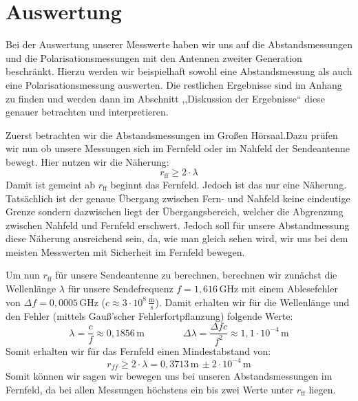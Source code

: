 \documentclass[titlepage,11pt,a4paper,ngerman]{article}
\newcommand{\tx}[1]{\textrm{#1}}
\begin{document}
\section{Auswertung}
Bei der Auswertung unserer Messwerte haben wir uns auf die Abstandsmessungen und die Polarisationsmessungen mit den Antennen zweiter Generation beschränkt. Hierzu werden wir beispielhaft sowohl eine Abstandsmessung als auch eine Polarisationsmessung auswerten. Die restlichen Ergebnisse sind im Anhang zu finden und werden dann im Abschnitt  ,,Diskussion der Ergebnisse`` diese genauer betrachten und interpretieren. \par 
Zuerst betrachten wir die Abstandsmessungen im Großen Hörsaal.Dazu prüfen wir nun ob unsere Messungen sich im Fernfeld oder im Nahfeld der Sendeantenne bewegt. Hier nutzen wir die Näherung:
\begin{equation}
r_{\tx{ff}} \geqslant 2\cdot\lambda
\end{equation}
Damit ist gemeint ab $r_{\tx{ff}}$ beginnt das Fernfeld. Jedoch ist das nur eine Näherung. Tatsächlich ist der genaue Übergang zwischen Fern- und Nahfeld keine eindeutige Grenze sondern dazwischen liegt der Übergangsbereich, welcher die Abgrenzung zwischen Nahfeld und Fernfeld erschwert. Jedoch soll für unsere Abstandmessung diese Näherung ausreichend sein, da, wie man gleich sehen wird, wir uns bei dem meisten Messwerten mit Sicherheit im Fernfeld bewegen. \par 
Um nun $r_{\tx{ff}}$ für unsere Sendeantenne zu berechnen, berechnen wir zunächst die Wellenlänge $\lambda$ für unsere Sendefrequenz $f=1{,}616\,$GHz mit einem Ablesefehler von $\Delta f=0{,}0005\,$GHz ($c\approx 3\cdot10^{8}\,\frac{\tx{m}}{\tx{s}}$). Damit erhalten wir für die Wellenlänge und den Fehler (mittels Gauß'scher Fehlerfortpflanzung) folgende Werte:
\begin{equation*}
\lambda = \frac{c}{f} \approx 0{,}1856\,\tx{m} \qquad \qquad
\Delta \lambda = \frac{\Delta f c}{f^{2}} \approx 1{,}1 \cdot 10^{-4}\,\tx{m}
\end{equation*}
Somit erhalten wir für das Fernfeld einen Mindestabstand von: 
\begin{equation*}
r_{ff} \geqslant 2\cdot\lambda = 0{,}3713\,\tx{m}\, \pm 2\cdot10^{-4}\,\tx{m}
\end{equation*}
Somit können wir sagen wir bewegen uns bei unseren Abstandsmessungen im Fernfeld, da bei allen Messungen höchstens ein bis zwei Werte unter $r_{\tx{ff}}$ liegen.




\end{document}
